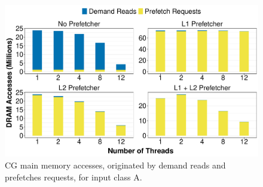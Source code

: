 \documentclass[AMA,final,STIX1COL]{WileyNJD-v2}
\newcommand{\vsg}[1]{\textcolor{blue}{\bfseries \ul{vsgirelli: #1} }\vspace{0.2cm}}
\begin{document}
\begin{figure}[!htb]
    \centering
    \includegraphics[width=.8\linewidth]{figures/fig4.pdf}
    \caption{CG main memory accesses, originated by demand reads and prefetches requests, for input class A.}
    \label{fig:drampapi}
\end{figure}



\end{document}
